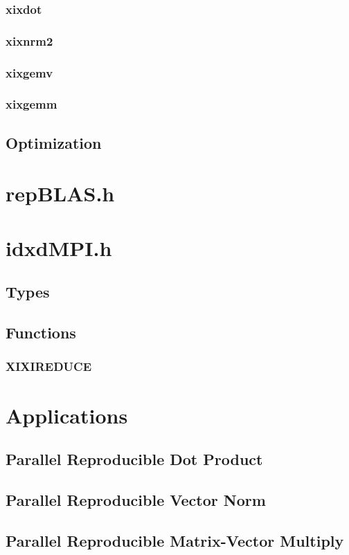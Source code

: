 \documentclass[12pt]{article}
\theoremstyle{plain}
\begin{document}
    \subsubsection{xixdot}
    \subsubsection{xixnrm2}
    \subsubsection{xixgemv}
    \subsubsection{xixgemm}
  \subsection{Optimization}
\section{repBLAS.h}
\section{idxdMPI.h}
  \subsection{Types}
  \subsection{Functions}
    \subsubsection{XIXIREDUCE}
\section{Applications}
  \subsection{Parallel Reproducible Dot Product}
  \subsection{Parallel Reproducible Vector Norm}
  \subsection{Parallel Reproducible Matrix-Vector Multiply}
\end{document}
